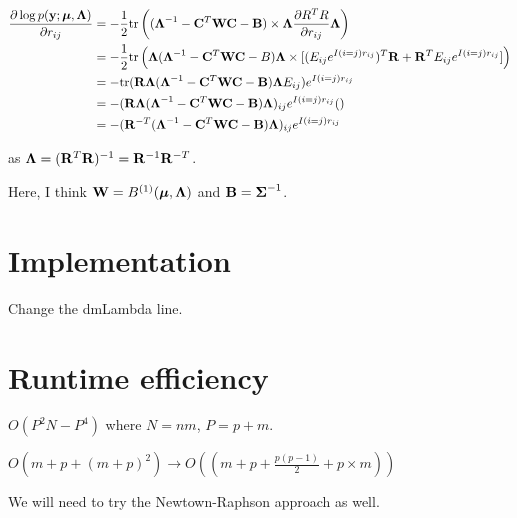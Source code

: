 \documentclass{article}[12pt]
\begin{document}
\begin{align*}
\frac{\partial \log p({\bf y}; {\boldsymbol \mu}, {\boldsymbol \Lambda})}{\partial r_{ij}} &= - {\frac{1}{2}} \text{tr} \left( ({\boldsymbol \Lambda}^{-1} - {\bf C}^T {\bf W} {\bf C} - {\bf B}) \times {\boldsymbol\Lambda} \frac{\partial R^T R}{\partial r_{ij}} {\boldsymbol \Lambda} \right) \\
&= - {\frac{1}{2}} \text{tr} \left( {\boldsymbol \Lambda}({\boldsymbol \Lambda}^{-1} - {\bf C}^T{\bf W}{\bf C} - B){\boldsymbol \Lambda} \times [(E_{ij} e^{I(i=j)r_{ij}})^T {\bf R} + {\bf R}^T E_{ij} e^{I(i=j) r_{ij}}] \right) \\
&= - \text{tr} ({\bf R} {\boldsymbol \Lambda} ({\boldsymbol \Lambda}^{-1} - {\bf C}^T {\bf W} {\bf C} - {\bf B}) {\boldsymbol \Lambda} E_{ij})e^{I(i=j) r_{ij}} \\
&= - ({\bf R} {\boldsymbol \Lambda} ({\boldsymbol \Lambda}^{-1} - {\bf C}^T {\bf W} {\bf C} - {\bf B}) {\boldsymbol \Lambda})_{ij} e^{I(i=j) r_{ij}} () \\
&= - ({\bf R}^{-T} ({\boldsymbol \Lambda}^{-1} - {\bf C}^T {\bf W} {\bf C} - {\bf B}) {\boldsymbol \Lambda})_{ij} e^{I(i=j) r_{ij}}
\end{align*}

as ${\boldsymbol \Lambda} = ({\bf R}^T {\bf R})^{-1} = {\bf R}^{-1} {\bf R}^{-T}$.

Here, I think ${\bf W} = B^{(1)}({\boldsymbol \mu}, {\boldsymbol \Lambda})$ and ${\bf B} = {\boldsymbol \Sigma}^{-1}$.

\section{Implementation}
Change the dmLambda line.

\section{Runtime efficiency}
$O(P^2 N - P^4)$ where $N=nm$, $P=p+m$.

$O(m + p + (m+p)^2) \to O((m + p + \frac{p(p-1)}{2} + p \times m))$

We will need to try the Newtown-Raphson approach as well.
\end{document}
